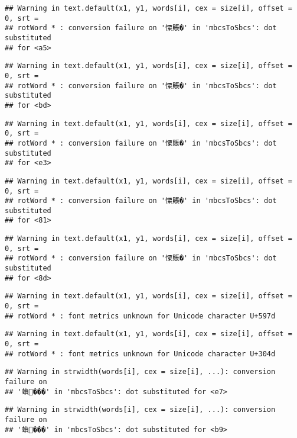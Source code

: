 \documentclass[]{article}
\begin{document}
\begin{verbatim}
## Warning in text.default(x1, y1, words[i], cex = size[i], offset = 0, srt =
## rotWord * : conversion failure on '憟賬�' in 'mbcsToSbcs': dot substituted
## for <a5>
\end{verbatim}

\begin{verbatim}
## Warning in text.default(x1, y1, words[i], cex = size[i], offset = 0, srt =
## rotWord * : conversion failure on '憟賬�' in 'mbcsToSbcs': dot substituted
## for <bd>
\end{verbatim}

\begin{verbatim}
## Warning in text.default(x1, y1, words[i], cex = size[i], offset = 0, srt =
## rotWord * : conversion failure on '憟賬�' in 'mbcsToSbcs': dot substituted
## for <e3>
\end{verbatim}

\begin{verbatim}
## Warning in text.default(x1, y1, words[i], cex = size[i], offset = 0, srt =
## rotWord * : conversion failure on '憟賬�' in 'mbcsToSbcs': dot substituted
## for <81>
\end{verbatim}

\begin{verbatim}
## Warning in text.default(x1, y1, words[i], cex = size[i], offset = 0, srt =
## rotWord * : conversion failure on '憟賬�' in 'mbcsToSbcs': dot substituted
## for <8d>
\end{verbatim}

\begin{verbatim}
## Warning in text.default(x1, y1, words[i], cex = size[i], offset = 0, srt =
## rotWord * : font metrics unknown for Unicode character U+597d
\end{verbatim}

\begin{verbatim}
## Warning in text.default(x1, y1, words[i], cex = size[i], offset = 0, srt =
## rotWord * : font metrics unknown for Unicode character U+304d
\end{verbatim}

\begin{verbatim}
## Warning in strwidth(words[i], cex = size[i], ...): conversion failure on
## '蝜���' in 'mbcsToSbcs': dot substituted for <e7>
\end{verbatim}

\begin{verbatim}
## Warning in strwidth(words[i], cex = size[i], ...): conversion failure on
## '蝜���' in 'mbcsToSbcs': dot substituted for <b9>
\end{verbatim}
\end{document}
